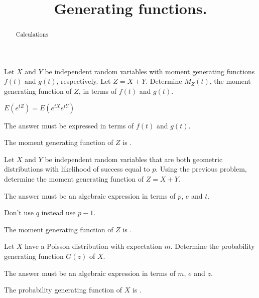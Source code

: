 \documentclass{ximera}
\title{Generating functions.}
\begin{document}
\begin{abstract}
Calculations
\end{abstract}
\maketitle

\begin{question} 
Let $X$ and $Y$ be independent random variables with moment generating functions $f(t)$ and $g(t)$, respectively. Let $Z=X+Y$. Determine $M_{Z}(t)$, the moment generating function of $Z$, in terms of $f(t)$ and $g(t)$.
     \begin{hint}
          $E(e^{tZ}) = E(e^{tX}e^{tY})$
     \end{hint}
     \begin{hint}
          The answer must be expressed in terms of $f(t)$ and $g(t)$.
     \end{hint}
     \begin{solution}
          The moment generating function of $Z$ is .
     \end{solution}
\end{question}

\begin{question}
Let $X$ and $Y$ be independent random variables that are both geometric distributions with likelihood of success equal to $p$. Using the previous problem, determine the moment generating function of $Z=X+Y$.
     \begin{hint}
          The answer must be an algebraic expression in terms of $p$, $e$ and $t$. 
     \end{hint}
     \begin{hint}
          Don't use $q$ instead use $p-1$.
     \end{hint} 
     \begin{solution}
          The moment generating function of $Z$ is .
     \end{solution}
\end{question}

\begin{question}
Let $X$ have a Poisson distribution with expectation $m$. Determine the probability generating function $G(z)$ of $X$.
     \begin{hint}
          The answer must be an algebraic expression in terms of $m$, $e$ and $z$.
     \end{hint}
     \begin{solution}
          The probability generating function of $X$ is .
     \end{solution}
\end{question}
\end{document}

